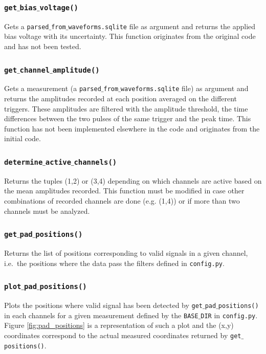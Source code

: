 \subsubsection{\texttt{get$\_$bias$\_$voltage()}}
Gets a \texttt{parsed$\_$from$\_$waveforms.sqlite} file as argument and returns the applied bias voltage with its uncertainty. This function originates from the original code and has not been tested.

\subsubsection{\texttt{get$\_$channel$\_$amplitude()}}
Gets a measurement (a \texttt{parsed$\_$from$\_$waveforms.sqlite} file) as argument and returns the amplitudes recorded at each position averaged on the different triggers. These amplitudes are filtered with the amplitude threshold, the time differences between the two pulses of the same trigger and the peak time. This function has not been implemented elsewhere in the code and originates from the initial code.

\subsubsection{\texttt{determine$\_$active$\_$channels()}}
Returns the tuples (1,2) or (3,4) depending on which channels are active based on the mean amplitudes recorded. This function must be modified in case other combinations of recorded channels are done (e.g. (1,4)) or if more than two channels must be analyzed.

\subsubsection{\texttt{get$\_$pad$\_$positions()}}
Returns the list of positions corresponding to valid signals in a given channel, i.e.\ the positions where the data pass the filters defined in \texttt{config.py}.

\subsubsection{\texttt{plot$\_$pad$\_$positions()}}
Plots the positions where valid signal has been detected by \texttt{get$\_$pad$\_$positions()} in each channels for a given measurement defined by the \texttt{BASE$\_$DIR} in \texttt{config.py}. Figure \ref{fig:pad_positions} is a representation of such a plot and the (x,y) coordinates correspond to the actual measured coordinates returned by \texttt{get$\_$positions()}. 

